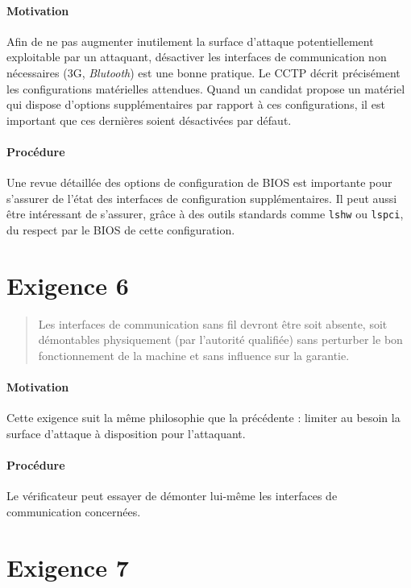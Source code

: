 \documentclass{report}
\begin{document}
\paragraph{Motivation}
%
Afin de ne pas augmenter inutilement la surface d’attaque potentiellement
exploitable par un attaquant, désactiver les interfaces de communication non
nécessaires (3G, \emph{Blutooth}) est une bonne pratique.
%
Le CCTP décrit précisément les configurations matérielles attendues.
%
Quand un candidat propose un matériel qui dispose d’options supplémentaires par
rapport à ces configurations, il est important que ces dernières soient
désactivées par défaut.

\paragraph{Procédure}
%
Une revue détaillée des options de configuration de BIOS est importante pour
s’assurer de l'état des interfaces de configuration supplémentaires.
%
Il peut aussi être intéressant de s’assurer, grâce à des outils standards comme
\texttt{lshw} ou \texttt{lspci}, du respect par le BIOS de cette configuration.

\section{Exigence 6}

\begin{quote}
  Les interfaces de communication sans fil devront être soit absente, soit
  démontables physiquement (par l’autorité qualifiée) sans perturber le bon
  fonctionnement de la machine et sans influence sur la garantie.
\end{quote}

\paragraph{Motivation}
%
Cette exigence suit la même philosophie que la précédente : limiter au besoin la
surface d’attaque à disposition pour l’attaquant.

\paragraph{Procédure}
%
Le vérificateur peut essayer de démonter lui-même les interfaces de
communication concernées.

\section{Exigence 7}
\end{document}
